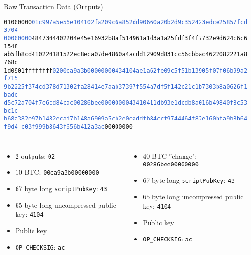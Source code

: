 \documentclass[]{beamer}
\begin{document}
\begin{frame}{Raw Transaction Data (Outputs)}
\begin{scriptsize}
\texttt{01000000\textcolor{highlight}{01c997a5e56e104102fa209c6a852dd90660a20b2d9c352423edce25857fcd3704
00000000}\textcolor{focus}{4847304402204e45e16932b8af514961a1d3a1a25fdf3f4f7732e9d624c6c61548
ab5fb8cd410220181522ec8eca07de4860a4acdd12909d831cc56cbbac4622082221a8768d
1d0901}ffffffff\textcolor{highlight}{0200ca9a3b00000000434104ae1a62fe09c5f51b13905f07f06b99a2f715
9b2225f374cd378d71302fa28414e7aab37397f554a7df5f142c21c1b7303b8a0626f1bade
d5c72a704f7e6cd84cac00286bee0000000043410411db93e1dcdb8a016b49840f8c53bc1e
b68a382e97b1482ecad7b148a6909a5cb2e0eaddfb84ccf9744464f82e160bfa9b8b64f9d4
c03f999b8643f656b412a3ac}00000000}
\end{scriptsize}
\vspace{1em}
\scriptsize
\begin{columns}
\begin{itemize}
	\item 2 outputs: \texttt{02}
	\item 10 BTC: \texttt{00ca9a3b00000000}
	\item 67 byte long \texttt{scriptPubKey}: \texttt{43}
	\item 65 byte long uncompressed public key: \texttt{4104}
	\item Public key
	\item \texttt{OP\_CHECKSIG}: \texttt{ac}
\end{itemize}
\begin{itemize}
	\item 40 BTC ''change": \texttt{00286bee00000000}
	\item 67 byte long \texttt{scriptPubKey}: \texttt{43}
	\item 65 byte long uncompressed public key: \texttt{4104}
	\item Public key
	\item \texttt{OP\_CHECKSIG}: \texttt{ac}
\end{itemize}
\end{columns}

\end{frame}
\end{document}

